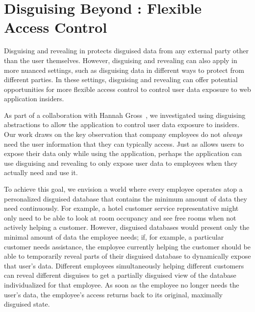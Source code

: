 \section{Disguising Beyond \sys: Flexible Access Control}
Disguising and revealing in \sys protects disguised data from any external party
other than the user themselves. However, disguising and revealing can also apply
in more nuanced settings, such as disguising data in different ways to 
protect from different parties. 
%
In these settings, disguising and revealing can offer potential opportunities for
more flexible access control to control user data exposure to web application
insiders.

%
As part of a collaboration with Hannah Gross~\cite{funhouse}, we investigated
using disguising abstractions to allow the application to control user data
exposure to insiders.
%
Our work draws on the key observation that company employees do not \emph{always}
need the user information that they can typically access.
%
Just as \sys allows users to expose their data only while using the application,
perhaps the application can use disguising and revealing to only expose user
data to employees when they actually need and use it.
%

%
To achieve this goal, we envision a world where every employee operates atop a
personalized disguised database that contains the minimum amount of data they
need continuously. For example, a hotel customer service representative might
only need to be able to look at room occupancy and see free rooms when not
actively helping a customer.
%
%
However, disguised databases would present only the minimal amount of data the
employee needs; if, for example, a particular customer needs assistance, the
employee currently helping the customer should be able to temporarily reveal
parts of their disguised database to dynamically expose that user's data.
%
Different employees simultaneously helping different customers can reveal
different disguises to get a partially disguised view of the database
individualized for that employee.
%
As soon as the employee no longer needs the user's data, the employee’s access
returns back to its original, maximally disguised state.
%

